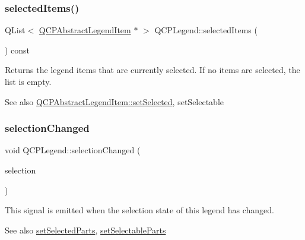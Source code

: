\subsubsection{\texorpdfstring{selected\+Items()}{selectedItems()}}
{\footnotesize\ttfamily Q\+List$<$ \hyperlink{class_q_c_p_abstract_legend_item}{Q\+C\+P\+Abstract\+Legend\+Item} $\ast$ $>$ Q\+C\+P\+Legend\+::selected\+Items (\begin{DoxyParamCaption}{ }\end{DoxyParamCaption}) const}

Returns the legend items that are currently selected. If no items are selected, the list is empty.

\begin{DoxySeeAlso}{See also}
\hyperlink{class_q_c_p_abstract_legend_item_a6eed93b0ab99cb3eabb043fb08179c2b}{Q\+C\+P\+Abstract\+Legend\+Item\+::set\+Selected}, set\+Selectable 
\end{DoxySeeAlso}
\hypertarget{class_q_c_p_legend_a82c88464edac07a9eefaf3906268df3b}{}\label{class_q_c_p_legend_a82c88464edac07a9eefaf3906268df3b} 
\subsubsection{\texorpdfstring{selection\+Changed}{selectionChanged}}
{\footnotesize\ttfamily void Q\+C\+P\+Legend\+::selection\+Changed (\begin{DoxyParamCaption}\item[{Q\+C\+P\+Legend\+::\+Selectable\+Parts}]{selection }\end{DoxyParamCaption})\hspace{0.3cm}{\ttfamily [signal]}}

This signal is emitted when the selection state of this legend has changed.

\begin{DoxySeeAlso}{See also}
\hyperlink{class_q_c_p_legend_a2aee309bb5c2a794b1987f3fc97f8ad8}{set\+Selected\+Parts}, \hyperlink{class_q_c_p_legend_a9ce60aa8bbd89f62ae4fa83ac6c60110}{set\+Selectable\+Parts} 
\end{DoxySeeAlso}
\hypertarget{class_q_c_p_legend_acd7be544c81324e391cfa6be9c413c01}{}\label{class_q_c_p_legend_acd7be544c81324e391cfa6be9c413c01} 
